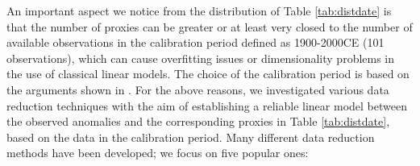 \documentclass[12pt]{amsart}
\theoremstyle{plain}
\theoremstyle{definition}
\theoremstyle{remark}
\begin{document}
An important aspect we notice from the distribution of Table
\ref{tab:distdate} is that the number of proxies can be greater or at least very
closed to the number of available observations in the calibration period defined as
1900-2000CE (101 observations), which can cause overfitting issues or
dimensionality problems in the use of classical linear models. The choice of the calibration period is based on the
  arguments shown in \cite{Barboza2014}. For the above
reasons, we investigated various data reduction techniques with the aim of establishing 
a reliable linear model between the observed anomalies and the corresponding proxies in
Table \ref{tab:distdate}, based on the data in the calibration
period. Many different data reduction methods have been developed; we focus on five popular ones:  
\end{document}

